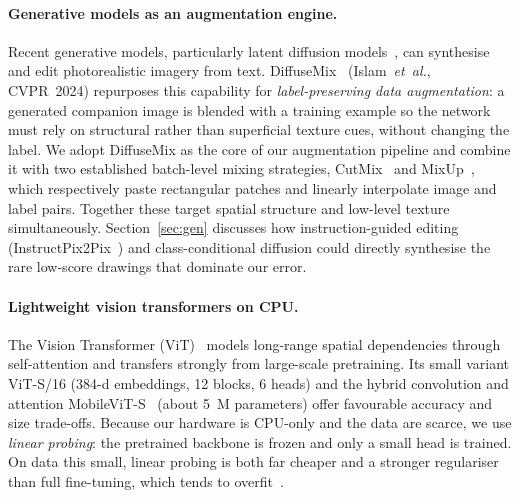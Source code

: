 \documentclass[10pt,twocolumn,letterpaper]{article}
\newcommand{\etal}{\textit{et~al.}}
\begin{document}
\paragraph{Generative models as an augmentation engine.}
Recent generative models, particularly latent diffusion
models~\cite{stablediffusion}, can synthesise and edit photorealistic imagery
from text. DiffuseMix~\cite{diffusemix} (Islam~\etal, CVPR~2024) repurposes
this capability for \emph{label-preserving data augmentation}: a generated
companion image is blended with a training example so the network must rely on
structural rather than superficial texture cues, without changing the label.
We adopt DiffuseMix as the core of our augmentation pipeline and combine it
with two established batch-level mixing strategies, CutMix~\cite{cutmix} and
MixUp~\cite{mixup}, which respectively paste rectangular patches and linearly
interpolate image and label pairs. Together these target spatial structure and
low-level texture simultaneously. Section~\ref{sec:gen} discusses how
instruction-guided editing (InstructPix2Pix~\cite{ip2p}) and class-conditional
diffusion could directly synthesise the rare low-score drawings that dominate
our error.

\paragraph{Lightweight vision transformers on CPU.}
The Vision Transformer (ViT)~\cite{vit} models long-range spatial dependencies
through self-attention and transfers strongly from large-scale pretraining.
Its small variant ViT-S/16 (384-d embeddings, 12 blocks, 6 heads) and the
hybrid convolution and attention MobileViT-S~\cite{mobilevit} (about 5~M
parameters) offer favourable accuracy and size trade-offs. Because our
hardware is CPU-only and the data are scarce, we use \emph{linear probing}: the
pretrained backbone is frozen and only a small head is trained. On data this
small, linear probing is both far cheaper and a stronger regulariser than full
fine-tuning, which tends to overfit~\cite{deit}.
\end{document}
